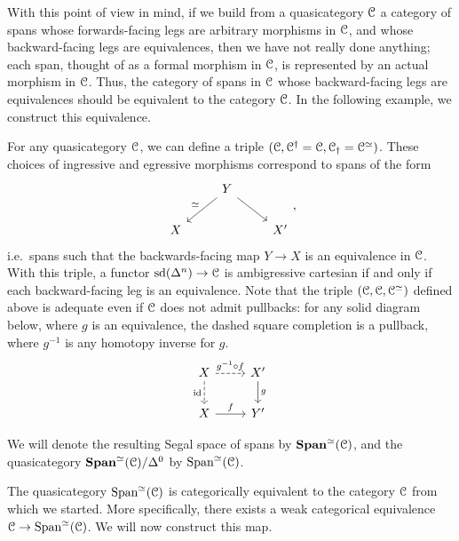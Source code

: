\documentclass[main.tex]{subfiles}
\begin{document}
With this point of view in mind, if we build from a quasicategory $\mathcal{C}$ a category of spans whose forwards-facing legs are arbitrary morphisms in $\mathcal{C}$, and whose backward-facing legs are equivalences, then we have not really done anything; each span, thought of as a formal morphism in $\mathcal{C}$, is represented by an actual morphism in $\mathcal{C}$. Thus, the category of spans in $\mathcal{C}$ whose backward-facing legs are equivalences should be equivalent to the category $\mathcal{C}$. In the following example, we construct this equivalence.

\begin{example}
  \label{eg:spans_with_equivalences_on_one_leg}
  For any quasicategory $\mathcal{C}$, we can define a triple $(\mathcal{C}, \mathcal{C}^{\dagger} = \mathcal{C}, \mathcal{C}_{\dagger} = \mathcal{C}^{\simeq})$. These choices of ingressive and egressive morphisms correspond to spans of the form
  \begin{equation*}
    \begin{tikzcd}
      & Y
      \arrow[dl, swap, "\simeq"]
      \arrow[dr]
      \\
      X
      && X'
    \end{tikzcd},
  \end{equation*}
  i.e.\ spans such that the backwards-facing map $Y \to X$ is an equivalence in $\mathcal{C}$. With this triple, a functor $\mathrm{sd}(\Delta^{n}) \to \mathcal{C}$ is ambigressive cartesian if and only if each backward-facing leg is an equivalence. Note that the triple $(\mathcal{C}, \mathcal{C}, \mathcal{C}^{\simeq})$ defined above is adequate even if $\mathcal{C}$ does not admit pullbacks: for any solid diagram below, where $g$ is an equivalence, the dashed square completion is a pullback, where $g^{-1}$ is any homotopy inverse for $g$.
  \begin{equation*}
    \begin{tikzcd}
      X
      \arrow[r, dashed, "g^{-1} \circ f"]
      \arrow[d, swap, dashed, "\id"]
      & X'
      \arrow[d, "g"]
      \\
      X
      \arrow[r, "f"]
      & Y'
    \end{tikzcd}
  \end{equation*}

  We will denote the resulting Segal space of spans by $\mathbf{Span}^{\simeq}(\mathcal{C})$, and the quasicategory $\mathbf{Span}^{\simeq}(\mathcal{C})/\Delta^{0}$ by $\mathrm{Span}^{\simeq}(\mathcal{C})$. 

  The quasicategory $\mathrm{Span}^{\simeq}(\mathcal{C})$ is categorically equivalent to the category $\mathcal{C}$ from which we started. More specifically, there exists a weak categorical equivalence $\mathcal{C} \to \mathrm{Span}^{\simeq}(\mathcal{C})$. We will now construct this map. 


\end{example}
\end{document}
